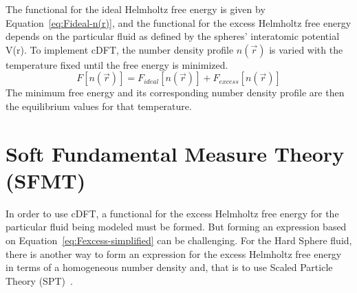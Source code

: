\documentclass[double,12pt]{beavtex}
\begin{document}
The functional for the ideal Helmholtz free energy is given by 
Equation~\ref{eq:Fideal-n(r)}, and the functional for the excess Helmholtz 
free energy depends on the particular fluid as defined by the spheres' 
interatomic potential V(r). To implement cDFT, the number density profile 
$n(\vec{r})$ is varied with the temperature fixed until the free energy 
is minimized. 
\begin{equation}{F[n(\vec{r})]=F_{ideal}[n(\vec{r})] + F_{excess}[n(\vec{r})]}\end{equation}
The minimum free energy and its corresponding number density 
profile are then the equilibrium values for that temperature.  

\section{Soft Fundamental Measure Theory (SFMT)}
In order to use cDFT, a functional for the excess Helmholtz free
energy for the particular fluid being modeled must be formed. But forming 
an expression based on Equation~\ref{eq:Fexcess-simplified} can be challenging. 
For the Hard Sphere fluid, there is another way to form an expression for 
the excess Helmholtz free energy in terms of a homogeneous number density 
and, that is to use Scaled Particle Theory (SPT)~\cite{ReissSPT}.
\end{document}

